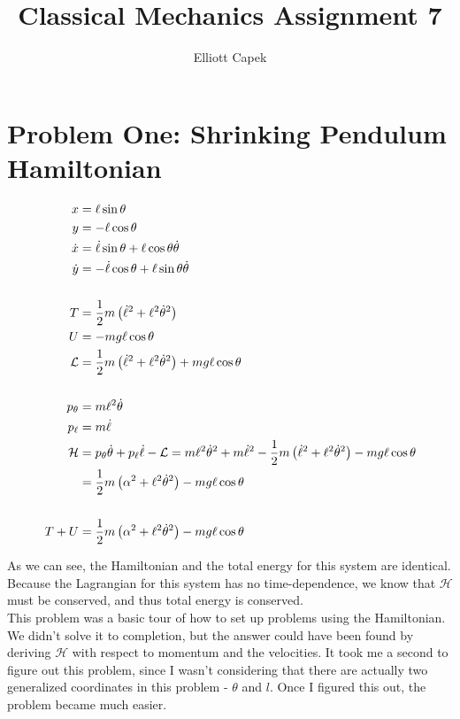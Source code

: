 \documentclass[10pt]{article} %
\title{Classical Mechanics Assignment 7}
\author{Elliott Capek}
\begin{document}
\maketitle{}

\section{Problem One: Shrinking Pendulum Hamiltonian}

\begin{align*}
  x &= \ell\sin\theta\\
  y &= -\ell\cos\theta\\
  \dot{x} &= \dot{\ell}\sin\theta + \ell\cos\theta\dot{\theta}\\
  \dot{y} &= -\dot{\ell}\cos\theta + \ell\sin\theta\dot{\theta}\\
  \vspace{1cm}\\
  T &= \frac{1}{2}m\left(\dot{\ell}^2 + \ell^2\dot{\theta}^2\right)\\
  U &= -mg\ell\cos\theta\\
  \mathcal{L} &= \frac{1}{2}m\left(\dot{\ell}^2 + \ell^2\dot{\theta}^2\right) + mg\ell\cos\theta\\
  \vspace{1cm}\\
  p_{\theta} &= m\ell^2\dot{\theta}\\
  p_{\ell} &= m\dot{\ell}\\
  \mathcal{H} &= p_{\theta}\dot{\theta} + p_{\ell}\dot{\ell} - \mathcal{L} = m\ell^2\dot{\theta}^2 + m\dot{\ell}^2 - \frac{1}{2}m\left(\dot{\ell}^2 + \ell^2\dot{\theta}^2\right) - mg\ell\cos\theta\\
  &= \frac{1}{2}m\left(\alpha^2 + \ell^2\dot{\theta}^2\right) - mg\ell\cos\theta\\
  \vspace{1cm}\\
  T + U &= \frac{1}{2}m\left(\alpha^2 + \ell^2\dot{\theta}^2\right) - mg\ell\cos\theta\\
\end{align*}

As we can see, the Hamiltonian and the total energy for this system are identical. Because the Lagrangian for this system has no time-dependence, we know that $\mathcal{H}$ must be conserved, and thus total energy is conserved.\\

This problem was a basic tour of how to set up problems using the Hamiltonian. We didn't solve it to completion, but the answer could have been found by deriving $\mathcal{H}$ with respect to momentum and the velocities. It took me a second to figure out this problem, since I wasn't considering that there are actually two generalized coordinates in this problem - $\theta$ and $l$. Once I figured this out, the problem became much easier.\\
\end{document}

